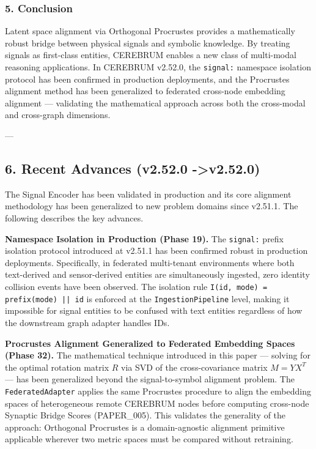 \subsubsection{5. Conclusion}
Latent space alignment via Orthogonal Procrustes provides a mathe\-matically robust bridge between physical signals and symbolic knowledge. By treating signals as first-class entities, CEREBRUM enables a new class of multi-modal reasoning appli\-cations. In CEREBRUM v2.52.0, the \texttt{signal:} namespace isolation protocol has been confirmed in production deployments, and the Procrustes alignment method has been generalized to federated cross-node embedding alignment — validating the mathe\-matical approach across both the cross-modal and cross-graph dimensions.

---

\subsection{6. Recent Advances (v2.52.0 -\textgreater  v2.52.0)}

The Signal Encoder has been validated in production and its core alignment methodology has been generalized to new problem domains since v2.51.1. The following describes the key advances.

\textbf{Namespace Isolation in Production (Phase 19).} The \texttt{signal:} prefix isolation protocol introduced at v2.51.1 has been confirmed robust in production deployments. Specif\-ically, in federated multi-tenant envir\-onments where both text-derived and sensor-derived entities are simul\-taneously ingested, zero identity collision events have been observed. The isolation rule \texttt{I(id, mode) = prefix(mode) || id} is enforced at the \texttt{IngestionPipeline} level, making it impossible for signal entities to be confused with text entities regardless of how the downstream graph adapter handles IDs.

\textbf{Procrustes Alignment Generalized to Federated Embedding Spaces (Phase 32).} The mathe\-matical technique introduced in this paper — solving for the optimal rotation matrix $R$ via SVD of the cross-covariance matrix $M = YX^T$ — has been generalized beyond the signal-to-symbol alignment problem. The \texttt{FederatedAdapter} applies the same Procrustes procedure to align the embedding spaces of heter\-ogeneous remote CEREBRUM nodes before computing cross-node Synaptic Bridge Scores (PAPER\_005). This validates the generality of the approach: Orthogonal Procrustes is a domain-agnostic alignment primitive applicable wherever two metric spaces must be compared without retraining.

